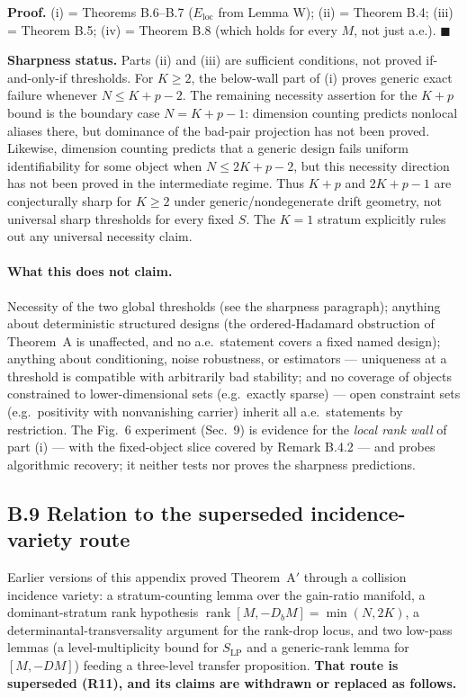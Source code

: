 \noindent\textbf{Proof.} (i) = Theorems B.6--B.7 ($E_{\mathrm{loc}}$ from Lemma W); (ii) = Theorem B.4; (iii) = Theorem B.5; (iv) = Theorem B.8 (which holds for every $M$, not just a.e.). \hfill$\blacksquare$

\begin{statusblock}\textbf{Sharpness status.} Parts (ii) and (iii) are sufficient conditions, not proved if-and-only-if thresholds. For $K\ge2$, the below-wall part of (i) proves generic exact failure whenever $N\le K+p-2$. The remaining necessity assertion for the $K+p$ bound is the boundary case $N=K+p-1$: dimension counting predicts nonlocal aliases there, but dominance of the bad-pair projection has not been proved. Likewise, dimension counting predicts that a generic design fails uniform identifiability for some object when $N\le2K+p-2$, but this necessity direction has not been proved in the intermediate regime. Thus $K+p$ and $2K+p-1$ are conjecturally sharp for $K\ge2$ under generic/nondegenerate drift geometry, not universal sharp thresholds for every fixed $S$. The $K=1$ stratum explicitly rules out any universal necessity claim.\end{statusblock}

\paragraph{What this does not claim.} Necessity of the two global thresholds (see the sharpness paragraph); anything about deterministic structured designs (the ordered-Hadamard obstruction of Theorem~A is unaffected, and no a.e.\ statement covers a fixed named design); anything about conditioning, noise robustness, or estimators --- uniqueness at a threshold is compatible with arbitrarily bad stability; and no coverage of objects constrained to lower-dimensional sets (e.g.\ exactly sparse) --- open constraint sets (e.g.\ positivity with nonvanishing carrier) inherit all a.e.\ statements by restriction. The Fig.~6 experiment (Sec.~9) is evidence for the \emph{local rank wall} of part (i) --- with the fixed-object slice covered by Remark B.4.2 --- and probes algorithmic recovery; it neither tests nor proves the sharpness predictions.

\subsection{B.9 Relation to the superseded incidence-variety route}

Earlier versions of this appendix proved Theorem~A$'$ through a collision incidence variety: a stratum-counting lemma over the gain-ratio manifold, a dominant-stratum rank hypothesis $\operatorname{rank}[M,-D_bM]=\min(N,2K)$, a determinantal-transversality argument for the rank-drop locus, and two low-pass lemmas (a level-multiplicity bound for $S_{\mathrm{LP}}$ and a generic-rank lemma for $[M,-DM]$) feeding a three-level transfer proposition. \textbf{That route is superseded (R11), and its claims are withdrawn or replaced as follows.}

